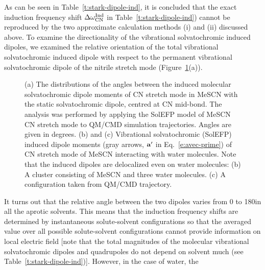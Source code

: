\documentclass[b5paper,oneside,fleqn,11pt]{book}
\begin{document}
\begin{refsection}
As can be seen in Table~\ref{t:stark-dipole-ind}, it is concluded that the exact
induction frequency shift $\Delta\omega_{\rm CN}^{\rm Ind}$ 
in Table~\ref{t:stark-dipole-ind}) cannot be
reproduced by the two approximate calculation methods (i)
and (ii) discussed above. To examine the directionality of the
vibrational solvatochromic induced dipoles, we examined the
relative orientation of the total vibrational solvatochromic
induced dipole with respect to the permanent vibrational
solvatochromic dipole of the nitrile stretch mode (Figure~\ref{f:solv-dip-directionality}(a)). 
%
\begin{figure}[t!]
\centering
\setlength\fboxsep{0.4pt}
\setlength\fboxrule{0.5pt}
\caption{
(a) The distributions of the angles between the induced molecular solvatochromic
dipole moments of CN stretch mode in MeSCN with the static solvatochromic dipole,
centred at CN mid\hyp{}bond. The analysis was performed by applying the SolEFP model of
MeSCN CN stretch mode to QM/CMD simulation trajectories. Angles are given in degrees.
(b) and (c) Vibrational solvatochromic (SolEFP) induced dipole moments 
(gray arrows, ${\bf a}'$ in Eq.~\eqref{e:avec-prime}) of CN stretch
mode of MeSCN interacting with water molecules. Note that the induced dipoles are delocalized even on
water molecules: (b) A cluster consisting of MeSCN and three water molecules. (c) A configuration taken
from QM/CMD trajectory.
\label{f:solv-dip-directionality}}
\end{figure}
%
It turns out that the relative angle between the two
dipoles varies from 0 to 180\textdegree in all the aprotic solvents. This
means that the induction frequency shifts are determined by
instantaneous solute\hyp{}solvent configurations so that the
averaged value over all possible solute\hyp{}solvent configurations
cannot provide information on local electric field [note that
the total magnitudes of the molecular vibrational
solvatochromic dipoles and quadrupoles do not depend on
solvent much (see Table~\ref{t:stark-dipole-ind})]. However, in the case of water, the

\end{refsection}
\end{document}
